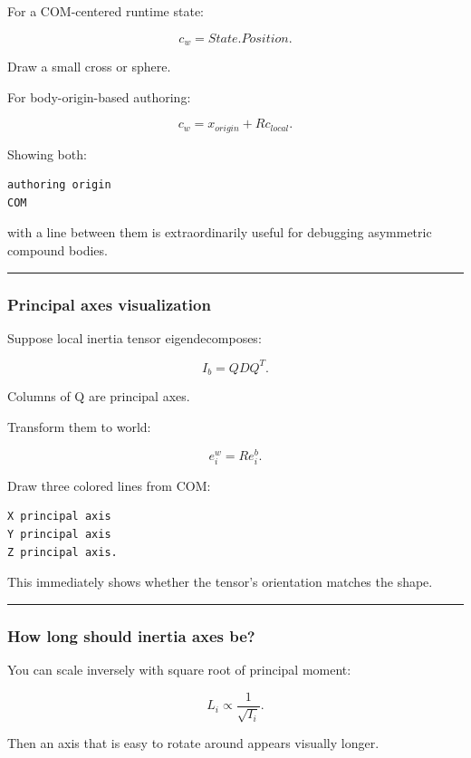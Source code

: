For a COM-centered runtime state:

\[
c_w=
State.Position.
\]

Draw a small cross or sphere.

For body-origin-based authoring:

\[
c_w
=
x_{origin}
+
R c_{local}.
\]

Showing both:

\begin{verbatim}
authoring origin
COM
\end{verbatim}

with a line between them is extraordinarily useful for debugging asymmetric compound bodies.

\begin{center}\rule{0.5\linewidth}{0.5pt}\end{center}

\subsubsection{Principal axes visualization}\label{principal-axes-visualization}

Suppose local inertia tensor eigendecomposes:

\[
I_b=QDQ^T.
\]

Columns of Q are principal axes.

Transform them to world:

\[
e_i^w=R e_i^b.
\]

Draw three colored lines from COM:

\begin{verbatim}
X principal axis
Y principal axis
Z principal axis.
\end{verbatim}

This immediately shows whether the tensor's orientation matches the shape.

\begin{center}\rule{0.5\linewidth}{0.5pt}\end{center}

\subsubsection{How long should inertia axes be?}\label{how-long-should-inertia-axes-be}

You can scale inversely with square root of principal moment:

\[
L_i
\propto
\frac1{\sqrt{I_i}}.
\]

Then an axis that is easy to rotate around appears visually longer.

